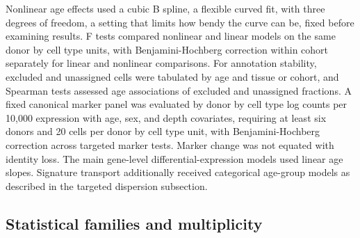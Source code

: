 \documentclass[11pt]{article}
\begin{document}
Nonlinear age effects used a cubic B spline, a flexible curved fit, with three degrees of freedom, a setting that limits how bendy the curve can be, fixed before examining results. F tests compared nonlinear and linear models on the same donor by cell type units, with Benjamini-Hochberg correction within cohort separately for linear and nonlinear comparisons. For annotation stability, excluded and unassigned cells were tabulated by age and tissue or cohort, and Spearman tests assessed age associations of excluded and unassigned fractions. A fixed canonical marker panel was evaluated by donor by cell type log counts per 10,000 expression with age, sex, and depth covariates, requiring at least six donors and 20 cells per donor by cell type unit, with Benjamini-Hochberg correction across targeted marker tests. Marker change was not equated with identity loss. The main gene-level differential-expression models used linear age slopes. Signature transport additionally received categorical age-group models as described in the targeted dispersion subsection.

\subsection*{Statistical families and multiplicity}
\end{document}
